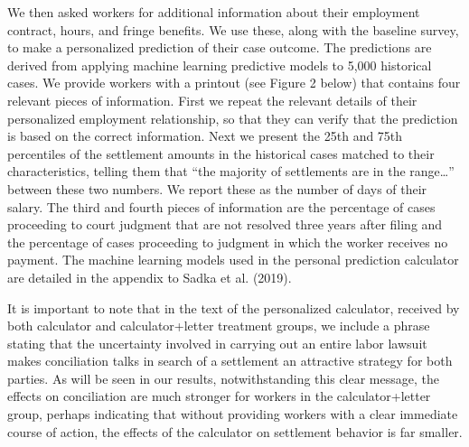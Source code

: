 \documentclass[12 pt]{article}
\begin{document}
We then asked workers for additional information about their employment contract, hours, and fringe benefits. We use these, along with the baseline survey, to make a personalized prediction of their case outcome. The predictions are derived from applying machine learning predictive models to 5,000 historical cases. We provide workers with a printout (see Figure 2 below) that contains four relevant pieces of information. First we repeat the relevant details of their personalized employment relationship, so that they can verify that the prediction is based on the correct information. Next we present the 25th and 75th percentiles of the settlement amounts in the historical cases matched to their characteristics, telling them that “the majority of settlements are in the range…” between these two numbers. We report these as the number of days of their salary. The third and fourth pieces of information are the percentage of cases proceeding to court judgment that are not resolved three years after filing and the percentage of cases proceeding to judgment in which the worker receives no payment. The machine learning models used in the personal prediction calculator are detailed in the appendix to Sadka et al. (2019). 

It is important to note that in the text of the personalized calculator, received by both calculator and calculator+letter treatment groups, we include a phrase stating that the uncertainty involved in carrying out an entire labor lawsuit makes conciliation talks in search of a settlement an attractive strategy for both parties. As will be seen in our results, notwithstanding this clear message, the effects on conciliation are much stronger for workers in the calculator+letter group, perhaps indicating that without providing workers with a clear immediate course of action, the effects of the calculator on settlement behavior is far smaller.
\end{document}
